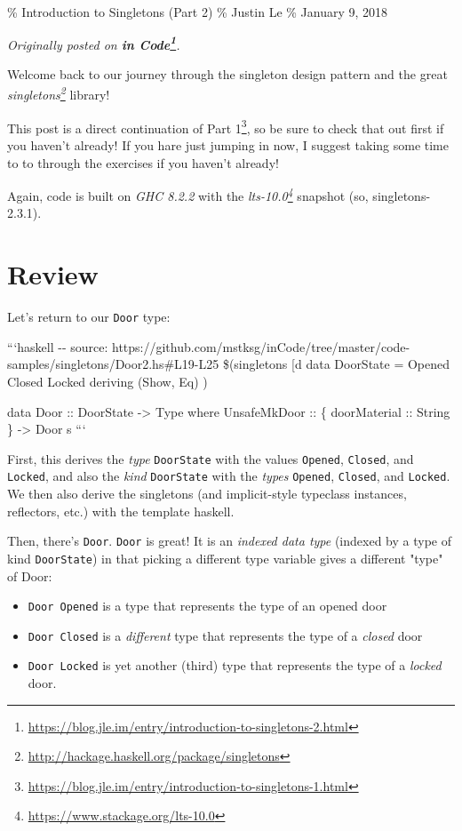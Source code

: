\documentclass[]{article}
\renewcommand{\href}[2]{#2\footnote{\url{#1}}}
\begin{document}
\% Introduction to Singletons (Part 2) \% Justin Le \% January 9, 2018

\emph{Originally posted on
\textbf{\href{https://blog.jle.im/entry/introduction-to-singletons-2.html}{in
Code}}.}

Welcome back to our journey through the singleton design pattern and the great
\emph{\href{http://hackage.haskell.org/package/singletons}{singletons}} library!

This post is a direct continuation of
\href{https://blog.jle.im/entry/introduction-to-singletons-1.html}{Part 1}, so
be sure to check that out first if you haven't already! If you hare just jumping
in now, I suggest taking some time to to through the exercises if you haven't
already!

Again, code is built on \emph{GHC 8.2.2} with the
\emph{\href{https://www.stackage.org/lts-10.0}{lts-10.0}} snapshot (so,
singletons-2.3.1).

\section{Review}

Let's return to our \texttt{Door} type:

```haskell -\/- source:
https://github.com/mstksg/inCode/tree/master/code-samples/singletons/Door2.hs\#L19-L25
\$(singletons {[}d\textbar{} data DoorState = Opened \textbar{} Closed
\textbar{} Locked deriving (Show, Eq) \textbar{}{]})

data Door :: DoorState -\textgreater{} Type where UnsafeMkDoor :: \{
doorMaterial :: String \} -\textgreater{} Door s ```

First, this derives the \emph{type} \texttt{DoorState} with the values
\texttt{Opened}, \texttt{Closed}, and \texttt{Locked}, and also the \emph{kind}
\texttt{DoorState} with the \emph{types} \texttt{\textquotesingle{}Opened},
\texttt{\textquotesingle{}Closed}, and \texttt{\textquotesingle{}Locked}. We
then also derive the singletons (and implicit-style typeclass instances,
reflectors, etc.) with the template haskell.

Then, there's \texttt{Door}. \texttt{Door} is great! It is an \emph{indexed data
type} (indexed by a type of kind \texttt{DoorState}) in that picking a different
type variable gives a different "type" of Door:

\begin{itemize}
\tightlist
\item
  \texttt{Door\ \textquotesingle{}Opened} is a type that represents the type of
  an opened door
\item
  \texttt{Door\ \textquotesingle{}Closed} is a \emph{different} type that
  represents the type of a \emph{closed} door
\item
  \texttt{Door\ \textquotesingle{}Locked} is yet another (third) type that
  represents the type of a \emph{locked} door.
\end{itemize}
\end{document}
